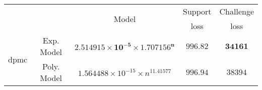 \begin{tabular}{ccccc} 
\hline 
 &  & \multirow{2}{*}{Model} & Support & Challenge\tabularnewline 
 &  &  & loss  & loss\tabularnewline 
\hline 
\hline 
\multirow{2}{*}{dpmc} & Exp. Model & $\mathbf{2.514915\times10^{-5}\times 1.707156^{n}}$ & $\mathbf{996.82}$ & $\mathbf{34161}$ \tabularnewline 
 & Poly. Model & $1.564488\times10^{-15}\times n^{11.41577}$ & $996.94$ & $38394$ \tabularnewline 
\hline 
\end{tabular} 


